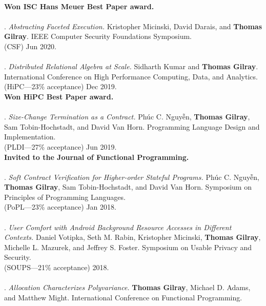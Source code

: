 \\\textbf{Won ISC Hans Meuer Best Paper award.} \\ \vspace{-0.1cm}\\
\paper. \textit{Abstracting Faceted Execution.}
Kristopher Micinski, David Darais, and \textbf{Thomas Gilray}.
IEEE Computer Security Foundations Symposium.
\\(CSF) Jun 2020. 
\\ \vspace{-0.1cm}\\
\paper. \textit{Distributed Relational Algebra at Scale.}
Sidharth Kumar and \textbf{Thomas Gilray}.
International Conference on High Performance Computing, Data, and Analytics.
\\(HiPC---23\% acceptance) Dec 2019. 
\\\textbf{Won HiPC Best Paper award.} \\ \vspace{-0.1cm}\\
\paper. \textit{Size-Change Termination as a Contract.}
Phúc C. Nguyễn, \textbf{Thomas Gilray}, Sam Tobin-Hochstadt, and David Van Horn.
Programming Language Design and Implementation.
\\(PLDI---27\% acceptance) Jun 2019. 
\\\textbf{Invited to the Journal of Functional Programming.} \\ \vspace{-0.1cm}\\
\paper. \textit{Soft Contract Verification for Higher-order Stateful Programs.}
Phúc C. Nguyễn, \textbf{Thomas Gilray}, Sam Tobin-Hochstadt, and David Van Horn.
Symposium on Principles of Programming Languages.
\\(PoPL---23\% acceptance) Jan 2018. 
\\ \vspace{-0.1cm}\\
\paper. \textit{User Comfort with Android Background Resource Accesses in Different Contexts.}
Daniel Votipka, Seth M. Rabin, Kristopher Micinski, \textbf{Thomas Gilray}, Michelle L. Mazurek, and Jeffrey S. Foster.
Symposium on Usable Privacy and Security.
\\(SOUPS---21\% acceptance) 2018. 
\\ \vspace{-0.1cm}\\
\paper. \textit{Allocation Characterizes Polyvariance.}
\textbf{Thomas Gilray}, Michael D. Adams, and Matthew Might.
International Conference on Functional Programming.
